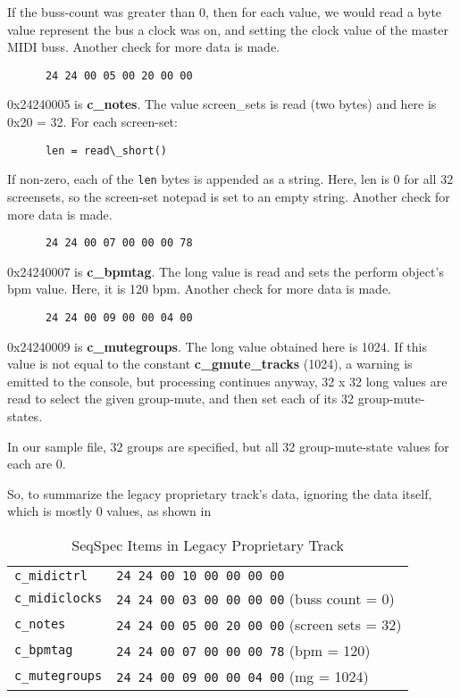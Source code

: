    If the buss-count was greater than 0, then for each value, we would read a
   byte value represent the bus a clock was on, and setting the clock value
   of the master MIDI buss.
   Another check for more data is made.

   \begin{verbatim}
      24 24 00 05 00 20 00 00
   \end{verbatim}

   0x24240005 is \textbf{c\_notes}.  The value screen\_sets is read (two
   bytes) and
   here is 0x20 = 32.  For each screen-set:

   \begin{verbatim}
      len = read\_short()
   \end{verbatim}

   If non-zero, each of the \texttt{len} bytes is appended as a string.
   Here, len is 0 for all 32 screensets, so the screen-set notepad is set to
   an empty string.
   Another check for more data is made.

   \begin{verbatim}
      24 24 00 07 00 00 00 78
   \end{verbatim}

   0x24240007 is \textbf{c\_bpmtag}.  The long value is read and sets the
   perform object's bpm value.  Here, it is 120 bpm.
   Another check for more data is made.

   \begin{verbatim}
      24 24 00 09 00 00 04 00
   \end{verbatim}

   0x24240009 is \textbf{c\_mutegroups}.  The long value obtained here is
   1024.  If this value is not equal to the constant
   \textbf{c\_gmute\_tracks} (1024), a warning is emitted to the console,
   but processing continues anyway, 32 x 32 long values are read to select
   the given group-mute, and then set each of its 32 group-mute-states.

   In our sample file, 32 groups are specified, but all 32 group-mute-state
   values for each are 0.

   So, to summarize the legacy proprietary track's data, ignoring the data
   itself, which is mostly 0 values, as shown in

   \begin{table}[htb]
      \centering
      \caption{SeqSpec Items in Legacy Proprietary Track}
      \label{table:seqspec_items_legacy_track}
      \begin{tabular}{l l}
\texttt{c\_midictrl}    & \texttt{24 24 00 10 00 00 00 00} \\
\texttt{c\_midiclocks}  & \texttt{24 24 00 03 00 00 00 00} (buss count = 0) \\
\texttt{c\_notes}       & \texttt{24 24 00 05 00 20 00 00} (screen sets = 32) \\
\texttt{c\_bpmtag}      & \texttt{24 24 00 07 00 00 00 78} (bpm = 120) \\
\texttt{c\_mutegroups}  & \texttt{24 24 00 09 00 00 04 00} (mg = 1024) \\
      \end{tabular}
   \end{table}

